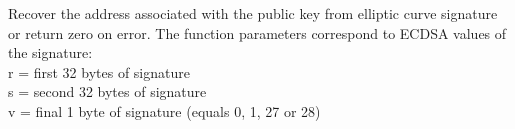 Recover the address associated with the public key from elliptic curve signature or return zero on error. The function parameters correspond to ECDSA values of the signature:
\\
r = first 32 bytes of signature\\
s = second 32 bytes of signature\\
v = final 1 byte of signature (equals {{0}}, {{1}}, {{27}} or {{28}})\\


